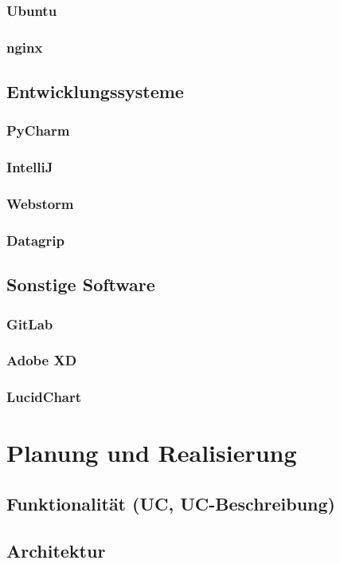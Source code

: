 \documentclass{report}
\begin{document}
\subsection{Ubuntu}
\subsection{nginx}

\section{Entwicklungssysteme}
\subsection{PyCharm}
\subsection{IntelliJ}
\subsection{Webstorm}
\subsection{Datagrip}
\section{Sonstige Software}
\subsection{GitLab}
\subsection{Adobe XD}
\subsection{LucidChart}

\chapter{Planung und Realisierung}
\section{Funktionalität (UC, UC-Beschreibung)}
\section{Architektur}
\end{document}
